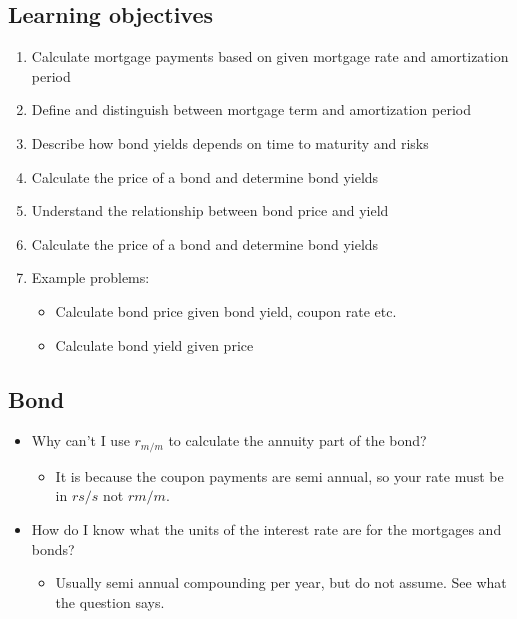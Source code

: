 \subsection{Learning objectives}
\begin{definition}
    \begin{enumerate}
        \item Calculate mortgage payments based on given mortgage rate and amortization period
        \item Define and distinguish between mortgage term and amortization period
        \item Describe how bond yields depends on time to maturity and risks
        \item Calculate the price of a bond and determine bond yields
        \item Understand the relationship between bond price and yield
        \item Calculate the price of a bond and determine bond yields
        \item Example problems:
        \begin{itemize}
            \item Calculate bond price given bond yield, coupon rate etc.
            \item Calculate bond yield given price
        \end{itemize}
    \end{enumerate}
\end{definition}

\subsection{Bond}
\begin{itemize}
    \item Why can't I use $r_{m/m}$ to calculate the annuity part of the bond? 
    \begin{itemize}
        \item It is because the coupon payments are semi annual, so your rate must be in $rs/s$ not $rm/m$.
    \end{itemize}
    \item How do I know what the units of the interest rate are for the mortgages and bonds?
    \begin{itemize}
        \item Usually semi annual compounding per year, but do not assume. See what the question says. 
    \end{itemize}
\end{itemize}

